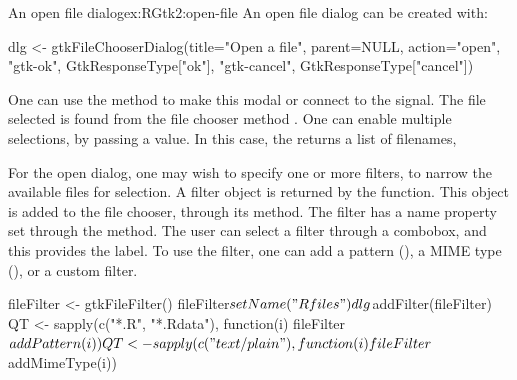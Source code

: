 \begin{example}{An open file dialog}{ex:RGtk2:open-file}
An open file dialog can be created with:

\begin{Schunk}
\begin{Sinput}
 dlg <- gtkFileChooserDialog(title="Open a file", 
                      parent=NULL, action="open",
                      "gtk-ok", GtkResponseType["ok"],
                      "gtk-cancel", GtkResponseType["cancel"])
\end{Sinput}
\end{Schunk}

One can use the  method to make this modal or connect to the
 signal. The file selected is found from the file
chooser method . One can enable
multiple selections, by passing
 a  value. In
this case, the  returns a list of filenames,

\begin{Schunk}
\end{Schunk}

For the open dialog, one may wish to specify one or more filters, to narrow the
available files for selection. A filter object is returned by the
 function.
This object is added to the file chooser, through its
 method. The filter has a name
property set through the  method. The
user can select a filter through a combobox, and this provides the
label. To use
the filter, one can add a pattern (),
a MIME type (), or a custom filter. 

\begin{Schunk}
\begin{Sinput}
 fileFilter <- gtkFileFilter()
 fileFilter$setName("R files")
 dlg$addFilter(fileFilter)
 QT <- sapply(c("*.R", "*.Rdata"), 
              function(i) fileFilter$addPattern(i))
 QT <- sapply(c("text/plain"), 
              function(i) fileFilter$addMimeType(i))
\end{Sinput}
\end{Schunk}
\end{example}

